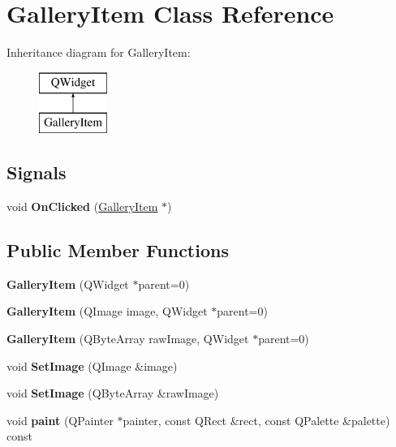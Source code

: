 \hypertarget{class_gallery_item}{}\section{Gallery\+Item Class Reference}
\label{class_gallery_item}
Inheritance diagram for Gallery\+Item\+:\begin{figure}[H]
\begin{center}
\leavevmode
\includegraphics[height=2.000000cm]{class_gallery_item}
\end{center}
\end{figure}
\subsection*{Signals}
\begin{DoxyCompactItemize}
\item 
\mbox{\label{class_gallery_item_a3b81d36365eaf5edfaf7a9da1df40cf3}} 
void {\bfseries On\+Clicked} (\hyperlink{class_gallery_item}{Gallery\+Item} $\ast$)
\end{DoxyCompactItemize}
\subsection*{Public Member Functions}
\begin{DoxyCompactItemize}
\item 
\mbox{\label{class_gallery_item_a6a6378ce7933d1a4b47eca274304c197}} 
{\bfseries Gallery\+Item} (Q\+Widget $\ast$parent=0)
\item 
\mbox{\label{class_gallery_item_a1a09ea56fceeada2155c81d202fa96b5}} 
{\bfseries Gallery\+Item} (Q\+Image image, Q\+Widget $\ast$parent=0)
\item 
\mbox{\label{class_gallery_item_a5936087e511bd7c1bf9f084139a6b170}} 
{\bfseries Gallery\+Item} (Q\+Byte\+Array raw\+Image, Q\+Widget $\ast$parent=0)
\item 
\mbox{\label{class_gallery_item_a598e7b8ff25a9348418fa7310fdaa457}} 
void {\bfseries Set\+Image} (Q\+Image \&image)
\item 
\mbox{\label{class_gallery_item_a9f32ccbb78113342f47e9f683b2fdc26}} 
void {\bfseries Set\+Image} (Q\+Byte\+Array \&raw\+Image)
\item 
\mbox{\label{class_gallery_item_a5cb9b089c96585d4fff385a1498efdfd}} 
void {\bfseries paint} (Q\+Painter $\ast$painter, const Q\+Rect \&rect, const Q\+Palette \&palette) const
\end{DoxyCompactItemize}
